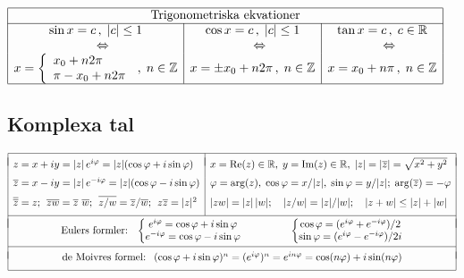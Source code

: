 \documentclass{article}
\begin{document}
\vspace{5 mm}



$\begin{array}{|c|c|c|}
  \hline
  \multicolumn{3}{|c|}{\mbox{Trigonometriska ekvationer}}\\ %
  \cline{1-3}
  \sin x=c\,, \;|c|\leq 1 &
  \cos x=c\,, \;|c|\leq 1&
  \tan x=c\,, \;c\in\mathbb{R}\\\;\;\;\;\iff&
\;\;\;\;\iff&\;\;\;\;\iff\\x=\left\{\begin{array}{l}x_0+n2\pi\\\pi-x_0+n2\pi\end{array}\right.\,,\;n\in\mathbb{Z}&x=\pm x_0+n2\pi\,,\;n\in\mathbb{Z}&x=x_0+n\pi\,,\;n\in\mathbb{Z}

\\\hline\end{array}$

\subsection*{Komplexa tal}%

$  %
\begin{array}{|l|l|}
  \hline & \\*[-8pt]
  z=x+iy    =|z|\,e^{ i\varphi}=|z|(\cos\varphi+i\sin\varphi) & 
 x=\text{Re}(z)\in\Rone,\;
 y=\text{Im}(z)\in\Rone,\;
 |z| = |\ob z| = \sqrt{x^2+y^2}
  \EndRow
  \ob z=x-iy=|z|\,e^{-i\varphi}=|z|(\cos\varphi-i\sin\varphi) & 
  \varphi = \arg (z), 
  \;
  \cos\varphi = x/|z|,
  \;
  \sin\varphi = y/|z|  ;
  \;
  \arg(\ob z) = -\varphi
  \EndRow
  \ob{\ob z} = z ;
  \;\,
  \ob{zw} = \ob z\,\,\ob w ;
  \;\,
  \ob{z / w} = \ob z/\ob w ;
  \;\,
  z\ob z = |z|^2
  &
  |zw| = |z|\,|w| ;
  \quad
  |z/w| = |z|/|w| ;
  \quad
  |z+w| \le |z| + |w|
  \EndRow \cline{1-2} \multicolumn{2}{|l|}{}\\*[-9pt]
  \multicolumn{2}{|c|}{
  \text{Eulers formler: \ }
  \left\{\begin{matrix}
  e^{i\varphi}   =  \cos \varphi + i \sin \varphi\\
  e^{-i\varphi}  =  \cos \varphi - i \sin \varphi\\
  \end{matrix}\right.
  \hfil
  \left\{\begin{matrix}
    \cos\varphi = (e^{i\varphi}+e^{-i\varphi})/2\\
    \sin\varphi = (e^{i\varphi}-e^{-i\varphi})/2i\\
  \end{matrix}\right.
  }
  \\*[9pt]
  \cline{1-2}
  \multicolumn{2}{|l|}{}\\*[-7pt]
  \multicolumn{2}{|c|}{\text{de Moivres formel: \ }
  (\cos\varphi+i\sin\varphi)^n 
  =(e^{i\varphi})^n
  =e^{in\varphi}
  =\cos(n\varphi)+i\sin(n\varphi) 
  }
  \EndRow
  \hline
\end{array}
$
\end{document}

